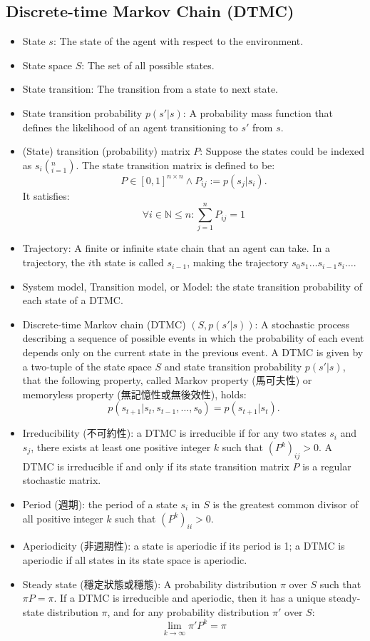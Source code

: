 \documentclass[a4paper,12pt]{report}
\begin{document}
\subsection{Discrete-time Markov Chain (DTMC)}
\begin{itemize}
\item State $s$: The state of the agent with respect to the environment.
\item State space $S$: The set of all possible states.
\item State transition: The transition from a state to next state.
\item State transition probability $p(s'|s)$: A probability mass function that defines the likelihood of an agent transitioning to $s'$ from $s$.
\item (State) transition (probability) matrix $P$: Suppose the states could be indexed as $s_i\left(_{i=1}^n\right)$. The state transition matrix is defined to be:
\[P\in[0,1]^{n\times n}\land P_{ij}:=p(s_j|s_i).\]
It satisfies:
\[\forall i\in\mathbb{N}\leq n\colon\sum_{j=1}^nP_{ij}=1\]
\item Trajectory: A finite or infinite state chain that an agent can take. In a trajectory, the $i$th state is called $s_{i-1}$, making the trajectory $s_0s_1\ldots s_{i-1}s_i\ldots$.
\item System model, Transition model, or Model: the state transition probability of each state of a DTMC.
\item Discrete-time Markov chain (DTMC) $(S,p(s'|s))$: A stochastic process describing a sequence of possible events in which the probability of each event depends only on the current state in the previous event. A DTMC is given by a two-tuple of the state space $S$ and state transition probability $p(s'|s)$, that the following property, called Markov property (馬可夫性) or memoryless property (無記憶性或無後效性), holds:
\[p(s_{t+1}|s_t,s_{t-1},\ldots,s_0)=p(s_{t+1}|s_t).\]
\item Irreducibility (不可約性): a DTMC is irreducible if for any two states $s_i$ and $s_j$, there exists at least one positive integer $k$ such that $(P^k)_{ij}>0$. A DTMC is irreducible if and only if its state transition matrix $P$ is a regular stochastic matrix.
\item Period (週期): the period of a state $s_i$ in $S$ is the greatest common divisor of all positive integer $k$ such that $(P^k)_{ii}>0$.
\item Aperiodicity (非週期性): a state is aperiodic if its period is 1; a DTMC is aperiodic if all states in its state space is aperiodic.
\item Steady state (穩定狀態或穩態): A probability distribution $\pi$ over $S$ such that $\pi P = \pi$. If a DTMC is irreducible and aperiodic, then it has a unique steady-state distribution $\pi$, and for any probability distribution $\pi'$ over $S$:
\[\lim_{k\to\infty}\pi'P^k=\pi\]
\end{itemize}
\end{document}

